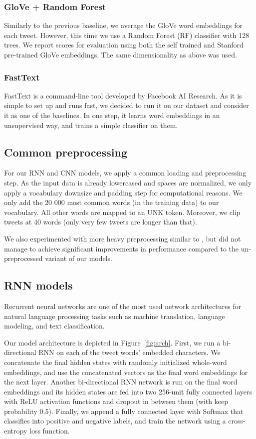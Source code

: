 \documentclass[10pt,conference,compsocconf]{IEEEtran}
\begin{document}
\subsubsection{GloVe + Random Forest}
Similarly to the previous baseline, we average the GloVe word embeddings for each tweet. However, this time we use a Random Forest (RF) classifier \cite{random-forests} with 128 trees. We report scores for evaluation using both the self trained and Stanford pre-trained GloVe embeddings. The same dimensionality as above was used.

\subsubsection{FastText}
FastText \cite{joulin2017bag} is a command-line tool developed by Facebook AI Research. As it is simple to set up and runs fast, we decided to run it on our dataset and consider it as one of the baselines. In one step, it learns word embeddings in an unsupervised way, and trains a simple classifier on them. 

\subsection{Common preprocessing}
For our RNN and CNN models, we apply a common loading and preprocessing step. As the input data is already lowercased and spaces are normalized, we only apply a vocabulary downsize and padding step for computational reasons.
We only add the 20 000 most common words (in the training data) to our vocabulary. All other words are mapped to an UNK token. Moreover, we clip tweets at 40 words (only very few tweets are longer than that).

We also experimented with more heavy preprocessing similar to \cite{twitter_preprocessing}, but did not manage to achieve significant improvements in performance compared to the un-preprocessed variant of our models.

\subsection{RNN models}
Recurrent neural networks are one of the most used network architectures for natural language processing tasks such as machine translation, language modeling, and text classification.

Our model architecture is depicted in Figure~\ref{fig:arch}. First, we run a bi-directional RNN on each of the tweet words' embedded characters. We concatenate the final hidden states with randomly initialized whole-word embeddings, and use the concatenated vectors as the final word embeddings for the next layer.
Another bi-directional RNN network is run on the final word embeddings and its hidden states are fed into two 256-unit fully connected layers with ReLU activation functions and dropout \cite{dropout1,dropout2} in between them (with keep probability 0.5). Finally, we append a fully connected layer with Softmax that classifies into positive and negative labels,
and train the network using a cross-entropy loss function. 
\end{document}
